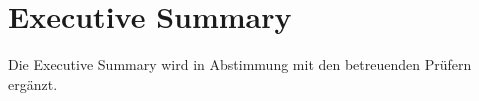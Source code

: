{}
\section*{Executive Summary}


Die Executive Summary wird in Abstimmung mit den betreuenden Prüfern ergänzt.
